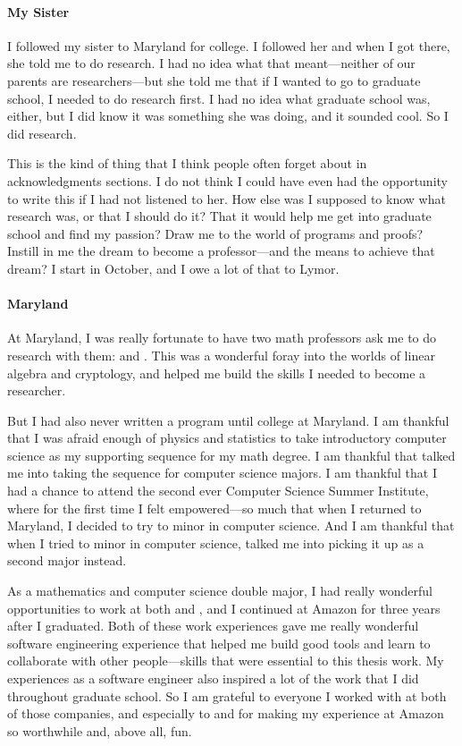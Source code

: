 \documentclass[ twoside,openright,titlepage,numbers=noenddot,headinclude,
                footinclude=true,cleardoublepage=empty,abstractoff,%
                BCOR=5mm,paper=letter,fontsize=11pt,letterpaper,%
                american,%
                ]{scrreprt}
\begin{document}
\paragraph{My Sister}
I followed my sister  to Maryland for college.
I followed her and when I got there, she told me to do research.
I had no idea what that meant---neither of our parents are researchers---but she told me that if I wanted to go to graduate school,
I needed to do research first.
I had no idea what graduate school was, either, but I did know it was something she was doing, and it sounded cool.
So I did research.

This is the kind of thing that I think people often forget about in acknowledgments sections.
I do not think I could have even had the opportunity to write this if I had not listened to her.
How else was I supposed to know what research was, or that I should do it?
That it would help me get into graduate school and find my passion?
Draw me to the world of programs and proofs?
Instill in me the dream to become a professor---and the means to achieve that dream?
I start in October, and I owe a lot of that to Lymor.

\paragraph{Maryland}
At Maryland, I was really fortunate to have two math professors ask me to do research with them:
 and .
This was a wonderful foray into the worlds of linear algebra and cryptology,
and helped me build the skills I needed to become a researcher.

But I had also never written a program until college at Maryland.
I am thankful that I was afraid enough of physics and statistics to take
introductory computer science as my supporting sequence for my math degree.
I am thankful that  talked me into taking the sequence for computer science majors.
I am thankful that I had a chance to attend the second ever  Computer Science Summer Institute,
where for the first time I felt empowered---so much that when I returned to Maryland,
I decided to try to minor in computer science.
And I am thankful that when I tried to minor in computer science,
 talked me into picking it up as a second major instead.

As a mathematics and computer science double major, I had really wonderful opportunities
to work at both  and , and I continued at Amazon for three years after I graduated.
Both of these work experiences gave me really wonderful software engineering experience that helped me build good tools and 
learn to collaborate with other people---skills that were essential to this thesis work.
My experiences as a software engineer also inspired a lot of the work that I did throughout graduate school.
So I am grateful to everyone I worked with at both of those companies,
and especially to  and  for making my experience at Amazon so worthwhile and, above all, fun.
\end{document}
